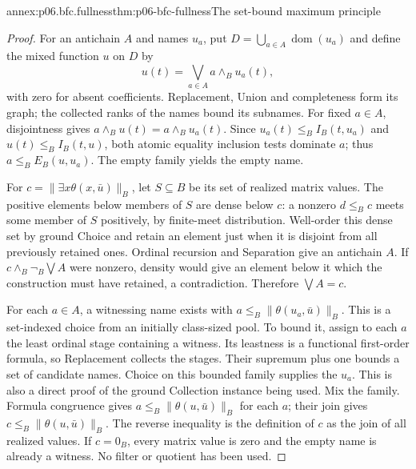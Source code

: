 \begin{annexitem}{annex:p06.bfc.fullness}{thm:p06-bfc-fullness}{The set-bound maximum principle}
\begin{proof}
For an antichain \(A\) and names \(u_a\), put
\(D=\bigcup_{a\in A}\operatorname{dom}(u_a)\) and define the mixed
function \(u\) on \(D\) by
\[
 u(t)=\bigvee_{a\in A}a\wedge_B u_a(t),
\]
with zero for absent coefficients. Replacement, Union and completeness
form its graph; the collected ranks of the names bound its subnames.
For fixed \(a\in A\), disjointness gives
\(a\wedge_B u(t)=a\wedge_B u_a(t)\). Since
\(u_a(t)\leq_B I_B(t,u_a)\) and \(u(t)\leq_B I_B(t,u)\), both
atomic equality inclusion tests dominate \(a\); thus \(a\leq_B E_B(u,u_a)\).
The empty family yields the empty name.

For \(c=\lVert\exists x\theta(x,\bar u)\rVert_B\), let
\(S\subseteq B\) be its set of realized matrix values. The positive
elements below members of \(S\) are dense below \(c\): a nonzero
\(d\leq_B c\) meets some member of \(S\) positively, by finite-meet
distribution. Well-order this dense set by ground Choice and retain
an element just when it is disjoint from all previously retained ones.
Ordinal recursion and Separation give an antichain \(A\). If
\(c\wedge_B\neg_B\bigvee A\) were nonzero, density would give an
element below it which the construction must have retained, a contradiction.
Therefore \(\bigvee A=c\).

For each \(a\in A\), a witnessing name exists with
\(a\leq_B\lVert\theta(u_a,\bar u)\rVert_B\). This is a set-indexed
choice from an initially class-sized pool. To bound it, assign to each
\(a\) the least ordinal stage containing a witness. Its leastness is
a functional first-order formula, so Replacement collects the stages.
Their supremum plus one bounds a set of candidate names. Choice on this
bounded family supplies the \(u_a\). This is also a direct proof of the
ground Collection instance being used. Mix the family. Formula congruence
gives \(a\leq_B\lVert\theta(u,\bar u)\rVert_B\) for each \(a\);
their join gives \(c\leq_B\lVert\theta(u,\bar u)\rVert_B\).
The reverse inequality is the definition of \(c\) as the join of all
realized values. If \(c=0_B\), every matrix value is zero and the empty
name is already a witness. No filter or quotient has been used.
\end{proof}
\end{annexitem}

